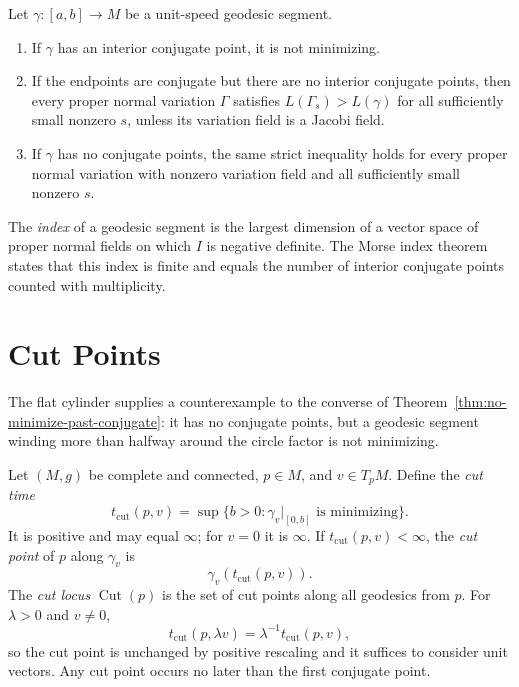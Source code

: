 \begin{corollary}
\label{cor:conjugate-point-not-minimizing}

Let $\gamma\colon[a,b]\to M$ be a unit-speed geodesic segment.
\begin{enumerate}
\item[(a)] If $\gamma$ has an interior conjugate point, it is not minimizing.
\item[(b)] If the endpoints are conjugate but there are no interior conjugate
points, then every proper normal variation $\Gamma$ satisfies
$L(\Gamma_s)>L(\gamma)$ for all sufficiently small nonzero $s$, unless its
variation field is a Jacobi field.
\item[(c)] If $\gamma$ has no conjugate points, the same strict inequality
holds for every proper normal variation with nonzero variation field and all
sufficiently small nonzero $s$.
\end{enumerate}
\end{corollary}

The \emph{index} of a geodesic segment is the largest dimension of a vector
space of proper normal fields on which $I$ is negative definite. The Morse
index theorem states that this index is finite and equals the number of
interior conjugate points counted with multiplicity.

\section{Cut Points}

The flat cylinder supplies a counterexample to the converse of
Theorem~\ref{thm:no-minimize-past-conjugate}: it has no conjugate points, but a
geodesic segment winding more than halfway around the circle factor is not
minimizing.

Let $(M,g)$ be complete and connected, $p\in M$, and $v\in T_pM$. Define the
\emph{cut time}
\[
t_{\mathrm{cut}}(p,v)
=\sup\{b>0:\gamma_v|_{[0,b]}\text{ is minimizing}\}.
\]
It is positive and may equal $\infty$; for $v=0$ it is $\infty$. If
$t_{\mathrm{cut}}(p,v)<\infty$, the \emph{cut point} of $p$ along $\gamma_v$
is
\[
\gamma_v(t_{\mathrm{cut}}(p,v)).
\]
The \emph{cut locus} $\operatorname{Cut}(p)$ is the set of cut points along all
geodesics from $p$. For $\lambda>0$ and $v\ne0$,
\[
t_{\mathrm{cut}}(p,\lambda v)=\lambda^{-1}t_{\mathrm{cut}}(p,v),
\]
so the cut point is unchanged by positive rescaling and it suffices to consider
unit vectors. Any cut point occurs no later than the first conjugate point.

